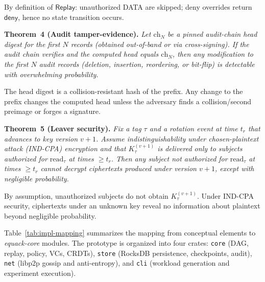 \documentclass[10pt,journal,compsoc]{IEEEtran}
\begin{document}
By definition of $\mathsf{Replay}$: unauthorized DATA are skipped; deny overrides return $\mathsf{deny}$, hence no state transition occurs.

\medskip
\noindent\textbf{Theorem~4 (Audit tamper-evidence).}
\textit{Let $\mathrm{ch}_N$ be a pinned audit-chain head digest for the first $N$ records (obtained out-of-band or via cross-signing). If the audit chain verifies and the computed head equals $\mathrm{ch}_N$, then any modification to the first $N$ audit records (deletion, insertion, reordering, or bit-flip) is detectable with overwhelming probability.}


The head digest is a collision-resistant hash of the prefix. Any change to the prefix changes the computed head unless the adversary finds a collision/second preimage or forges a signature.

\medskip
\noindent\textbf{Theorem~5 (Leaver security).}
\textit{Fix a tag $\tau$ and a rotation event at time $t_r$ that advances to key version $v{+}1$. Assume indistinguishability under chosen-plaintext attack (IND-CPA) encryption and that $K_{\tau}^{(v+1)}$ is delivered only to subjects authorized for $\mathrm{read}_\tau$ at times $\ge t_r$. Then any subject not authorized for $\mathrm{read}_\tau$ at times $\ge t_r$ cannot decrypt ciphertexts produced under version $v{+}1$, except with negligible probability.}


By assumption, unauthorized subjects do not obtain $K_{\tau}^{(v+1)}$. Under IND-CPA security, ciphertexts under an unknown key reveal no information about plaintext beyond negligible probability.


Table~\ref{tab:impl-mapping} summarizes the mapping from conceptual elements to \textit{equack-core} modules. The prototype is organized into four crates: \texttt{core} (DAG, replay, policy, VCs, CRDTs), \texttt{store} (RocksDB persistence, checkpoints, audit), \texttt{net} (libp2p gossip and anti-entropy), and \texttt{cli} (workload generation and experiment execution).
\end{document}
